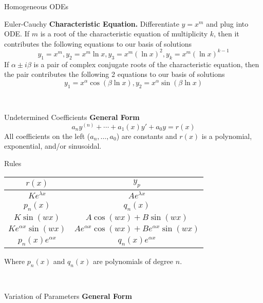 \documentclass{article}
\begin{document}
\begin{multicols*}{3}
\begin{blackbox}{Homogeneous ODEs}
{\begin{brownbox}{Euler-Cauchy}
        \textbf{Characteristic Equation.} Differentiate $y = x^m$ and plug into ODE. If $m$ is a root of the characteristic equation of multiplicity $k$, then it contributes the following equations to our basis of solutions
        \[y_1 = x^m, y_2 = x^m\ln x, y_3 = x^m (\ln x)^2, y_k = x^m(\ln x)^{k-1}\]
        If $\alpha \pm i\beta$ is a pair of complex conjugate roots of the characteristic equation, then the pair contributes the following 2 equations to our basis of solutions
        \[y_1 = x^{\alpha} \cos(\beta \ln x), y_2 = x^\alpha\sin(\beta \ln x)\]
    \end{brownbox}\\[-2ex]
    }
\end{blackbox}

\begin{blackbox}{Undetermined Coefficients}
    \textbf{General Form}\\[-2ex]
    \[a_ny^{(n)} + \cdots + a_1(x)y' + a_0y = r(x)\]
    All coefficients on the left ($a_n, \ldots, a_0$) are constants and $r(x)$ is a polynomial, exponential, and/or sinusoidal. 
    \begin{pinkbox}{Rules}
        \renewcommand{\arraystretch}{1.25}
        \begin{center}
            \begin{tabular}{|c|c|}
                \hline
                $r(x)$ & $y_p$\\
                \hline
                $Ke^{\lambda x}$ & $Ae^{\lambda x}$\\
                $p_n(x)$ & $q_n(x)$\\
                $K \sin(wx)$ & $A \cos(wx) + B \sin(wx)$\\
                $Ke^{\alpha x} \sin(wx)$ & $ A e^{\alpha x}\cos(wx) + Be^{\alpha x} \sin(wx)$\\
                $p_n(x)e^{\alpha x}$ & $q_n(x)e^{\alpha x}$\\
                \hline
            \end{tabular}
        \end{center}
        Where $p_n(x)$ and $q_n(x)$ are polynomials of degree $n$. 
    \end{pinkbox}\\[-2ex]
\end{blackbox}
\begin{blackbox}{Variation of Parameters}
    \textbf{General Form}\\[-2ex]

\end{blackbox}
\end{multicols*}
\end{document}
